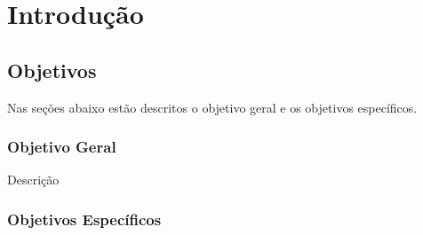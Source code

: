 \documentclass[
	12pt,				%
	oneside,			%
	a4paper,			%
	chapter=TITLE,		%
	section=TITLE,		%
	brazil,			%
	english				%
	]{abntex2}
\begin{document}
{%
	\hypersetup{hidelinks}
	\listoffigures*
	\cleardoublepage
	
	
	\listoftables*
	\cleardoublepage
	
	
	
	\tableofcontents*
	\cleardoublepage
	
}%


\textual

\renewcommand{\figurename}{Figure}
\renewcommand{\tablename}{Table}

\hypertarget{introduuxe7uxe3o}{%
\chapter{Introdução}\label{introduuxe7uxe3o}}

\hypertarget{objetivos}{%
\section{Objetivos}\label{objetivos}}

Nas seções abaixo estão descritos o objetivo geral e os objetivos
específicos.

\hypertarget{objetivo-geral}{%
\subsection{Objetivo Geral}\label{objetivo-geral}}

Descrição

\hypertarget{objetivos-especuxedficos}{%
\subsection{Objetivos Específicos}\label{objetivos-especuxedficos}}
\end{document}
